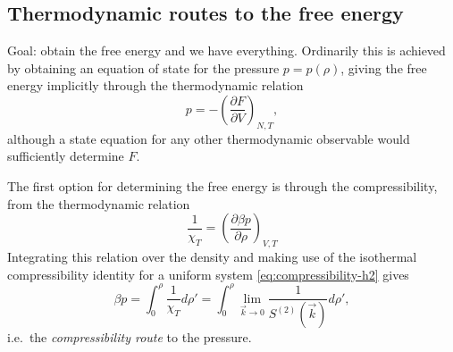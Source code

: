 \subsection{Thermodynamic routes to the free energy}

Goal: obtain the free energy and we have everything.
Ordinarily this is achieved by obtaining an equation of state for the pressure $p = p(\rho)$, giving the free energy implicitly through the thermodynamic relation
\begin{equation}\label{eq:pressure-relation-1}
  p
  =
  - \left( \frac{\partial F}{\partial V} \right)_{N,T},
\end{equation}
although a state equation for any other thermodynamic observable would sufficiently determine $F$.

The first option for determining the free energy is through the compressibility, from the thermodynamic relation
\begin{equation}
  \frac{1}{\chi_T}
  =
  \left( \frac{\partial \beta p}{\partial \rho} \right)_{V,T}
\end{equation}
Integrating this relation over the density and making use of the isothermal compressibility identity for a uniform system \eqref{eq:compressibility-h2} gives
\begin{equation}\label{eq:compressibility-route-pressure}
  \beta p
  =
  \int_0^\rho \frac{1}{\chi_T} d\rho'
  =
  \int_0^\rho \lim_{\vec{k} \to 0} \frac{1}{S^{(2)}(\vec{k})} d\rho',
\end{equation}
i.e.\ the \emph{compressibility route} to the pressure.


